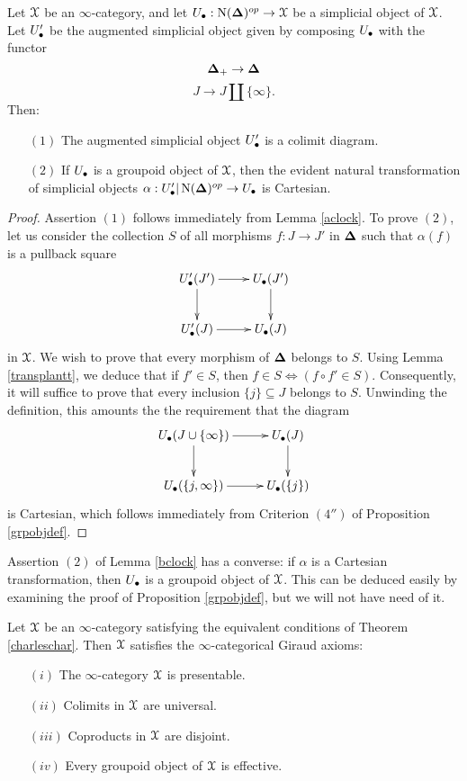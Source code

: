 \begin{lemma}\label{bclock}
Let $\operatorname{\mathcal{X}}$ be an $\infty$-category, and let $U_{\bullet}: \operatorname{N}(\operatorname{{\bf \Delta}})^{op} \rightarrow \operatorname{\mathcal{X}}$ be a simplicial object of $\operatorname{\mathcal{X}}$. Let $U'_{\bullet}$ be the augmented simplicial object
given by composing $U_{\bullet}$ with the functor
$$ \operatorname{{\bf \Delta}}_{+} \rightarrow \operatorname{{\bf \Delta}}$$
$$ J \rightarrow J \amalg \{ \infty \}.$$
Then:
\begin{itemize}
\item[$(1)$] The augmented simplicial object $U'_{\bullet}$ is a colimit diagram.
\item[$(2)$] If $U_{\bullet}$ is a groupoid object of $\operatorname{\mathcal{X}}$, then the evident natural transformation of simplicial objects $\alpha: U'_{\bullet} | \operatorname{N}(\operatorname{{\bf \Delta}})^{op} \rightarrow U_{\bullet}$ is Cartesian.
\end{itemize}
\end{lemma}

\begin{proof}
Assertion $(1)$ follows immediately from Lemma \ref{aclock}. To prove $(2)$, let us consider
the collection $S$ of all morphisms $f: J \rightarrow J'$ in $\operatorname{{\bf \Delta}}$ such that
$\alpha(f)$ is a pullback square
$$ \xymatrix{ U'_{\bigdot}(J') \ar[r] \ar[d] & U_{\bigdot}(J') \ar[d] \\
U'_{\bigdot}(J) \ar[r] & U_{\bigdot}(J) }$$
in $\operatorname{\mathcal{X}}$. We wish to prove that every morphism of $\operatorname{{\bf \Delta}}$ belongs to $S$. Using Lemma \ref{transplantt}, we deduce that if $f' \in S$, then $f \in S \Leftrightarrow (f \circ f' \in S)$. Consequently, it will suffice to prove that every inclusion $\{j\} \subseteq J$ belongs to $S$.
Unwinding the definition, this amounts the the requirement that the diagram
$$ \xymatrix{ U_{\bigdot}( J \cup \{\infty\} ) \ar[d]  \ar[r] & U_{\bigdot}( J) \ar[d] \\
U_{\bigdot} ( \{j, \infty\} ) \ar[r] & U_{\bigdot}( \{j\} )}$$
is Cartesian, which follows immediately from Criterion $(4'')$ of Proposition \ref{grpobjdef}.
\end{proof}

\begin{remark}
Assertion $(2)$ of Lemma \ref{bclock} has a converse: if $\alpha$ is a Cartesian transformation, then $U_{\bullet}$ is a groupoid object of $\operatorname{\mathcal{X}}$. This can be deduced easily by examining the proof of Proposition \ref{grpobjdef}, but we will not have need of it.
\end{remark}

\begin{proposition}\label{lemonade2}
Let $\operatorname{\mathcal{X}}$ be an $\infty$-category satisfying the equivalent conditions of Theorem \ref{charleschar}. Then $\operatorname{\mathcal{X}}$ satisfies the $\infty$-categorical Giraud axioms:
\begin{itemize}
\item[$(i)$] The $\infty$-category $\operatorname{\mathcal{X}}$ is presentable.
\item[$(ii)$] Colimits in $\operatorname{\mathcal{X}}$ are universal.
\item[$(iii)$] Coproducts in $\operatorname{\mathcal{X}}$ are disjoint.
\item[$(iv)$] Every groupoid object of $\operatorname{\mathcal{X}}$ is effective.
\end{itemize}
\end{proposition}


